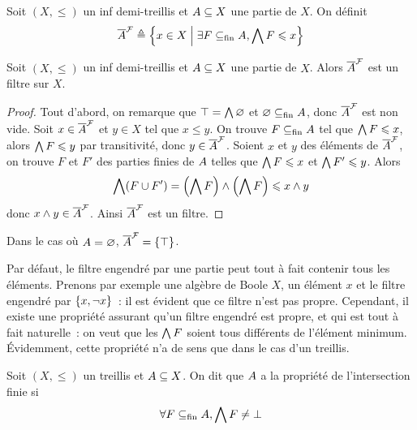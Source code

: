 \begin{definition}
  Soit $(X,\leq)$ un inf demi-treillis et $A\subseteq X$ une partie de $X$.
  On définit
  \[\overline{A}^{\mathcal{F}} \triangleq
  \left\{ x\in X \;\middle\vert\; \exists F\subseteq_{\mathrm{fin}} A, \bigwedge F \leqslant x \right\}\]
\end{definition}

\begin{proposition}
  Soit $(X,\leq)$ un inf demi-treillis et $A\subseteq X$ une partie de $X$.
  Alors $\overline{A}^{\mathcal{F}}$ est un filtre sur $X$.
\end{proposition}

\begin{proof}
  Tout d'abord, on remarque que $\top = \bigwedge \varnothing$ et
  $\varnothing\subseteq_{\mathrm{fin}} A$, donc $\overline{A}^{\mathcal{F}}$ est non vide. Soit
  $x\in \overline{A}^{\mathcal{F}}$ et $y\in X$ tel que $x\leq y$. On trouve
  $F\subseteq_{\mathrm{fin}} A$ tel que $\bigwedge F\leqslant x$, alors $\bigwedge F \leqslant y$ par
  transitivité, donc $y\in \overline{A}^{\mathcal{F}}$. Soient $x$ et $y$ des éléments de
  $\overline{A}^{\mathcal{F}}$, on trouve $F$ et $F'$ des parties finies de $A$
  telles que $\bigwedge F \leqslant x$ et $\bigwedge F' \leqslant y$. Alors
  \[\bigwedge (F\cup F') = \left(\bigwedge F\right)\wedge\left(\bigwedge F\right)
  \leqslant x\wedge y\]
  donc $x\wedge y \in \overline{A}^{\mathcal{F}}$. Ainsi $\overline{A}^{\mathcal{F}}$ est un
  filtre.
\end{proof}

\begin{remark}
  Dans le cas où $A = \varnothing$, $\overline{A}^{\mathcal{F}} = \{\top\}$.
\end{remark}

Par défaut, le filtre engendré par une partie peut tout à fait contenir tous
les éléments. Prenons par exemple une algèbre de Boole $X$, un élément $x$ et le
filtre engendré par $\{x,\lnot x\}$~: il est évident que ce filtre n'est pas
propre. Cependant, il existe une propriété assurant qu'un filtre engendré est
propre, et qui est tout à fait naturelle~: on veut que les $\bigwedge F$ soient
tous différents de l'élément minimum. \'Evidemment, cette propriété n'a
de sens que dans le cas d'un treillis.

\begin{definition}
  Soit $(X,\leq)$ un treillis et $A\subseteq X$. On dit que $A$ a la
  propriété de l'intersection finie si
  \[\forall F\subseteq_{\mathrm{fin}} A, \bigwedge F\neq \bot\]
\end{definition}

